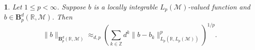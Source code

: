 \documentclass[oneside,english,a4wide]{amsart}
\numberwithin{equation}{section}
\numberwithin{figure}{section}
\theoremstyle{plain}
\theoremstyle{plain}
\newtheorem{prop}[thm]{\protect\propositionname}
\theoremstyle{definition}
\theoremstyle{plain}
\theoremstyle{remark}
\theoremstyle{definition}
\theoremstyle{remark}
\theoremstyle{definition}
\providecommand{\propositionname}{Proposition}
\newcommand{\M}{{\mathcal M}}
\newcommand{\8}{\infty}
\begin{document}

	
\begin{prop}\label{equbbk}
	Let $1\le p<\infty$. Suppose $b$ is a locally integrable $L_p(\M)$-valued function and $b\in \pmb{B}_p^{d}(\mathbb{R},\mathcal{M})$. Then
	\begin{equation*}
			\|b\|_{\pmb{B}_p^d(\mathbb{R},\M)} \approx_{d,p} \left(\sum_{k\in\mathbb{Z}} d^k \|b-b_k\|^p_{L_p(\mathbb{R},L_p(\mathcal{M}))}\right)^{1/p}.
	\end{equation*}
\end{prop}
\end{document}
